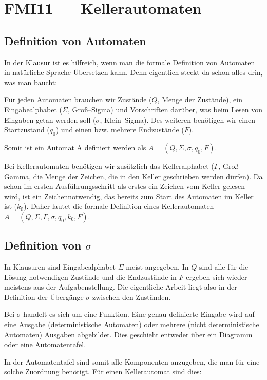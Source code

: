 \section{FMI11 --- Kellerautomaten}
\label{sec:fmi}

\subsection{Definition von Automaten}

In der Klausur ist es hilfreich, wenn man die formale Definition von Automaten in natürliche Sprache Übersetzen kann. Denn eigentlich steckt da schon alles drin, was man baucht:

Für jeden Automaten brauchen wir Zustände ($Q$, Menge der Zustände), ein Eingabealphabet ($\Sigma$, Groß--Sigma) und Vorschriften darüber, was beim Lesen von Eingaben getan werden soll ($\sigma$, Klein--Sigma). Des weiteren benötigen wir einen Startzustand ($q_0$) und einen bzw. mehrere Endzustände ($F$). 

Somit ist ein Automat A definiert werden als $A=(Q,\Sigma, \sigma, q_0, F)$.

Bei Kellerautomaten benötigen wir zusätzlich das Kelleralphabet ($\Gamma$, Groß--Gamma, die Menge der Zeichen, die in den Keller geschrieben werden dürfen). Da schon im ersten Ausführungsschritt als erstes ein Zeichen vom Keller gelesen wird, ist ein Zeichennotwendig, das bereits zum Start des Automaten im Keller ist ($k_0$). Daher lautet die formale Definition eines Kellerautomaten $A=(Q,\Sigma, \Gamma, \sigma, q_0, k_0, F)$.

\subsection{Definition von $\sigma$}

In Klausuren sind Eingabealphabet $\Sigma$ meist angegeben. In $Q$ sind alle für die Lösung notwendigen Zustände und die Endzustände in $F$ ergeben sich wieder meistens aus der Aufgabenstellung. Die eigentliche Arbeit liegt also in der Definition der Übergänge $\sigma$ zwischen den Zuständen.

Bei $\sigma$ handelt es sich um eine Funktion. Eine genau definierte Eingabe wird auf eine Ausgabe (deterministische Automaten) oder mehrere (nicht deterministische Automaten) Ausgaben abgebildet. Dies geschieht entweder über ein Diagramm oder eine Automatentafel.

In der Automatentafel sind somit alle Komponenten anzugeben, die man für eine solche Zuordnung benötigt.
Für einen Kellerautomat sind dies:

